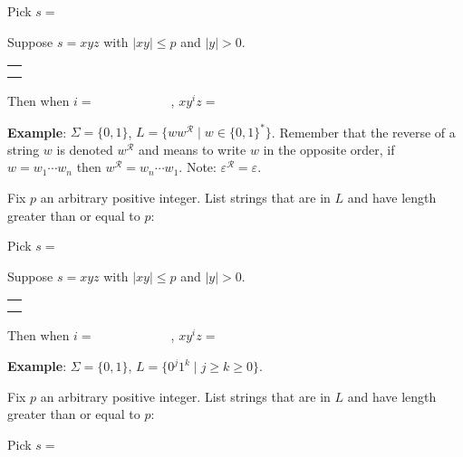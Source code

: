 \documentclass[12pt, oneside]{article}
\begin{document}
\vspace{20pt}

Pick $s = $


Suppose $s = xyz$ with  $|xy|  \leq  p$ and $|y| > 0$.
\begin{center}
\begin{tabular}{|c|}
\hline
 \\
\hspace{4in} \\
\hline
\end{tabular}
\end{center}

Then when $i = \hspace{1in}$, $xy^i z  = \hspace{1in}$

\vfill

\newpage

{\bf Example}: $\Sigma  =  \{0,1\}$, $L = \{w w^{\mathcal{R}} \mid w \in \{0,1\}^*\}$.
Remember that the reverse of a string $w$ is denoted $w^\mathcal{R}$  
and means to write $w$  in  the opposite order, if $w = w_1 \cdots  w_n$ then $w^\mathcal{R} = w_n \cdots  w_1$. Note: $\varepsilon^\mathcal{R} = \varepsilon$.


Fix $p$ an arbitrary positive integer. List strings that are in $L$ and have length  greater than or equal  to $p$:

\vspace{10pt}

Pick $s = $

Suppose $s = xyz$ with  $|xy|  \leq  p$ and $|y| > 0$.
\begin{center}
\begin{tabular}{|c|}
\hline
 \\
\hspace{4in} \\
\hline
\end{tabular}
\end{center}
Then when $i = \hspace{1in}$, $xy^i z  = \hspace{1in}$


\vfill


{\bf Example}: $\Sigma  =  \{0,1\}$, $L = \{0^j1^k  \mid j \geq k  \geq 0\}$.

Fix $p$ an arbitrary positive integer. List strings that are in $L$ and have length  greater than or equal  to $p$:

\vspace{10pt}

Pick $s = $
\end{document}
